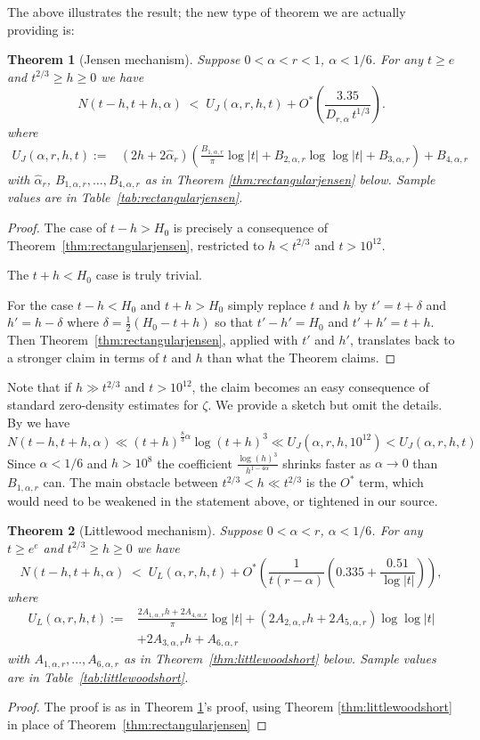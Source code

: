 \documentclass[10pt,english,letter, reqno]{amsart}
\newcommand{\Ostar}{O^{\ast}}
\theoremstyle{plain}
\newtheorem{theorem}{Theorem}
\theoremstyle{definition}
\begin{document}
The above illustrates the result; the new type of theorem we are actually providing is:
\begin{theorem}[Jensen mechanism]\label{thm:main-jensen}
Suppose $0<\alpha<r<1$, $\alpha<1/6$. For any $t\geq e$ and $t^{2/3}\geq h\geq 0$ we have
\[ N(t-h,t+h,\alpha) \;<\; U_J(\alpha,r,h,t) + \Ostar\!\left(\frac{3.35}{D_{r,\alpha}\,t^{1/3}}\right).\]
where
\begin{align*} 
U_J(\alpha,r,h,t) := &(2h+2\hat{\alpha}_r)\!\left(\frac{B_{1,\alpha,r}}{\pi}\log|t| + B_{2,\alpha,r}\log\log|t| + B_{3,\alpha,r}\right) + B_{4,\alpha,r}
\end{align*}
with $\hat{\alpha}_r$, $B_{1,\alpha,r},\ldots,B_{4,\alpha,r}$ as in Theorem
\ref{thm:rectangularjensen} below. Sample values are in Table~\ref{tab:rectangularjensen}.
\end{theorem}
\begin{proof}
The case of $t-h>H_0$ is precisely a consequence of Theorem~\ref{thm:rectangularjensen}, restricted to  $h<t^{2/3}$ and $t>10^{12}$.

The $t+h<H_0$ case is truly trivial.

For the case $t-h<H_0$ and $t+h>H_0$ simply replace $t$ and $h$ by $t' = t + \delta$ and $h' = h-\delta$ where $\delta = \frac{1}{2}(H_0-t+h)$
 so that $t'-h'=H_0$ and $t'+h'=t+h$. Then Theorem~\ref{thm:rectangularjensen}, applied with $t'$ and $h'$, translates back to a stronger claim in terms of $t$ and $h$
 than what the Theorem claims.
\end{proof}
Note that if $h\gg t^{2/3}$ and $t>10^{12}$, the claim becomes an easy consequence of standard zero-density estimates for $\zeta$. We provide a sketch but omit the details.
By \cite{KadiriLumleyNg2018} we have 
\[ N(t-h,t+h,\alpha) \ll (t+h)^{\frac{8}{3}\alpha}\log(t+h)^3 \ll   U_J(\alpha,r,h,10^{12}) < U_J(\alpha,r,h,t)  \]
Since $\alpha<1/6$ and $h>10^8$ the coefficient $\frac{\log(h)^3}{h^{1-4\alpha}}$ shrinks faster as $\alpha\to 0$ than $B_{1,\alpha,r}$ can.
The main obstacle between $t^{2/3} < h \ll t^{2/3}$ is the $\Ostar$ term, which would need to be weakened in the statement above, or tightened in our source.


\begin{theorem}[Littlewood mechanism]\label{thm:main-littlewood}
Suppose $0<\alpha<r$, $\alpha<1/6$. For any $t\geq e^e$ and $t^{2/3}\geq h\geq 0$ we have
\[  N(t-h,t+h,\alpha) \;<\;  U_L(\alpha,r,h,t) + \Ostar\!\left(\frac{1}{t(r-\alpha)}\left(0.335 + \frac{0.51}{\log|t|}\right)\right), \]
where
\begin{align*}
 U_L(\alpha,r,h,t) :=
&\frac{2A_{1,\alpha,r}h+2A_{4,\alpha,r}}{\pi}\log|t| + (2A_{2,\alpha,r}h+2A_{5,\alpha,r})\log\log|t|
\\&+ 2A_{3,\alpha,r}h+A_{6,\alpha,r}
\end{align*}
with $A_{1,\alpha,r},\ldots,A_{6,\alpha,r}$ as in Theorem~\ref{thm:littlewoodshort} below. Sample values are in Table~\ref{tab:littlewoodshort}.
\end{theorem}
\begin{proof}
The proof is as in Theorem
\ref{thm:main-jensen}'s proof, using Theorem
\ref{thm:littlewoodshort} in place of Theorem~\ref{thm:rectangularjensen}
\end{proof}
\end{document}
